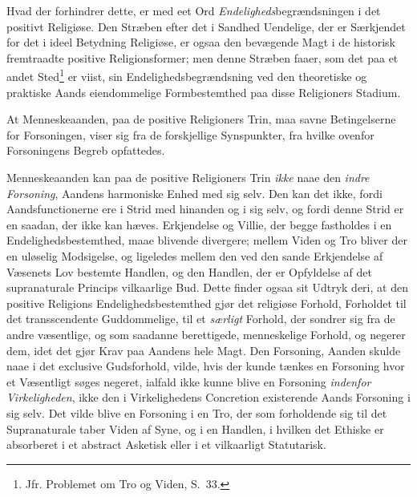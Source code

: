 Hvad der forhindrer dette, er med eet Ord \emph{Endeligheds}begrændsningen i det
positivt Religiøse. Den Stræben efter det i Sandhed Uendelige, der er Særkjendet
for det i ideel Betydning Religiøse, er ogsaa den bevægende Magt i de historisk
fremtraadte positive Religionsformer; men
 \setcounter{footnote}{0}%
denne Stræben faaer, som det paa et andet Sted\footnote{Jfr. Problemet om Tro og
Viden, S.\ 33.} er viist, sin Endelighedsbegrændsning ved den theoretiske og
praktiske Aands eiendommelige Formbestemthed paa disse Religioners Stadium.

At Menneskeaanden, paa de positive Religioners Trin, maa savne Betingelserne for
Forsoningen, viser sig fra de forskjellige Synspunkter, fra hvilke ovenfor
Forsoningens Begreb opfattedes.

Menneskeaanden kan paa de positive Religioners Trin \emph{ikke} naae den
\emph{indre Forsoning}, Aandens harmoniske Enhed med sig selv. Den kan det ikke,
fordi Aandsfunctionerne ere i Strid med hinanden og i sig selv, og fordi denne
Strid er en saadan, der ikke kan hæves. Erkjendelse og Villie, der begge fastholdes
i en Endelighedsbestemthed, maae blivende divergere; mellem Viden og Tro bliver der
en uløselig Modsigelse, og ligeledes mellem den ved den sande Erkjendelse af
Væsenets Lov bestemte Handlen, og den Handlen, der er Opfyldelse af det
supranaturale Princips vilkaarlige Bud. Dette finder ogsaa sit Udtryk deri, at den
positive Religions Endelighedsbestemthed gjør det religiøse Forhold, Forholdet til
det transscendente Guddommelige, til et \emph{særligt} Forhold, der sondrer sig fra
de andre væsentlige, og som saadanne berettigede, menneskelige Forhold, og negerer
dem, idet det gjør Krav paa Aandens hele Magt. Den Forsoning, Aanden skulde naae i
det exclusive Gudsforhold, vilde, hvis der kunde tænkes en Forsoning hvor et
Væsentligt søges negeret, ialfald ikke kunne blive en Forsoning \emph{indenfor
Virkeligheden}, ikke den i Virkelighedens Concretion existerende Aands Forsoning i
sig selv. Det vilde blive en Forsoning i en Tro, der som forholdende sig til det
Supranaturale taber Viden af Syne, og i en Handlen, i hvilken det Ethiske er
absorberet i et abstract Asketisk eller i et vilkaarligt Statutarisk.

